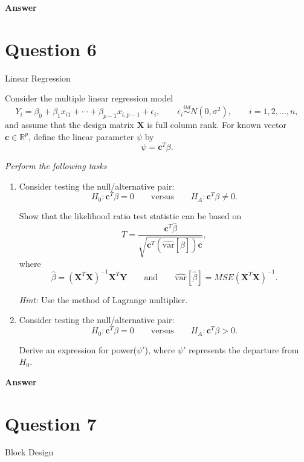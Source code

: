 \documentclass[letterpaper]{article}
\begin{document}
	\textbf{Answer}
	
	\clearpage
	
	\section{Question 6}
	
	{\color{deepred}   Linear Regression}
	
	Consider the multiple linear regression model
	\begin{equation}
		Y_i=\beta_0+\beta_1 x_{i1}+\cdots+\beta_{p-1}x_{i,p-1}+\epsilon_i,
		\qquad
		\epsilon_i\overset{iid}{\sim}N(0,\sigma^2),
		\qquad
		i=1,2,\ldots,n,
	\end{equation}
	and assume that the design matrix $\mathbf{X}$ is full column rank. For known vector $\mathbf{c}\in\mathbb{R}^p$, define the linear parameter $\psi$ by
	\[
	\psi=\mathbf{c}^T\beta.
	\]
	
	\emph{Perform the following tasks}
	\begin{enumerate}
		\item[(i)] Consider testing the null/alternative pair:
		\[
		H_0:\mathbf{c}^T\beta=0
		\qquad
		\text{versus}
		\qquad
		H_A:\mathbf{c}^T\beta\neq 0.
		\]
		
		Show that the likelihood ratio test statistic can be based on
		\[
		T=\frac{\mathbf{c}^T\hat{\beta}}{\sqrt{\mathbf{c}^T(\widehat{\mathrm{var}}[\hat{\beta}])\mathbf{c}}},
		\]
		where
		\[
		\hat{\beta}=(\mathbf{X}^T\mathbf{X})^{-1}\mathbf{X}^T\mathbf{Y}
		\qquad \text{and} \qquad
		\widehat{\mathrm{var}}[\hat{\beta}]=MSE(\mathbf{X}^T\mathbf{X})^{-1}.
		\]
		
		\emph{Hint:} Use the method of Lagrange multiplier.
		
		\item[(ii)] Consider testing the null/alternative pair:
		\[
		H_0:\mathbf{c}^T\beta=0
		\qquad
		\text{versus}
		\qquad
		H_A:\mathbf{c}^T\beta>0.
		\]
		
		Derive an expression for power($\psi'$), where $\psi'$ represents the departure from $H_0$.
	\end{enumerate}
	
	\textbf{Answer}
	
	\clearpage
	
	\section{Question 7}
	
	{\color{deepred}  Block Design}
	
\end{document}
